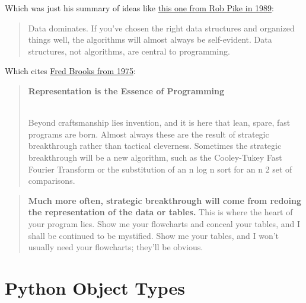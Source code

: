 \documentclass[
  letterpaper,
  DIV=11,
  numbers=noendperiod]{scrreport}
\begin{document}
Which was just his summary of ideas like
\href{http://doc.cat-v.org/bell_labs/pikestyle}{this one from Rob Pike
in 1989}:

\begin{quote}
Data dominates. If you've chosen the right data structures and organized
things well, the algorithms will almost always be self-evident. Data
structures, not algorithms, are central to programming.
\end{quote}

Which cites
\href{https://archive.org/stream/mythicalmanmonth00fred/mythicalmanmonth00fred_djvu.txt}{Fred
Brooks from 1975}:

\begin{quote}
\textbf{Representation is the Essence of Programming}\\
\strut \\
Beyond craftsmanship lies invention, and it is here that lean, spare,
fast programs are born. Almost always these are the result of strategic
breakthrough rather than tactical cleverness. Sometimes the strategic
breakthrough will be a new algorithm, such as the Cooley-Tukey Fast
Fourier Transform or the substitution of an n log n sort for an n 2 set
of comparisons.
\end{quote}

\begin{quote}
\textbf{Much more often, strategic breakthrough will come from redoing
the representation of the data or tables.} This is where the heart of
your program lies. Show me your flowcharts and conceal your tables, and
I shall be continued to be mystified. Show me your tables, and I won't
usually need your flowcharts; they'll be obvious.
\end{quote}

\hypertarget{python-object-types}{%
\chapter{Python Object Types}\label{python-object-types}}
\end{document}

